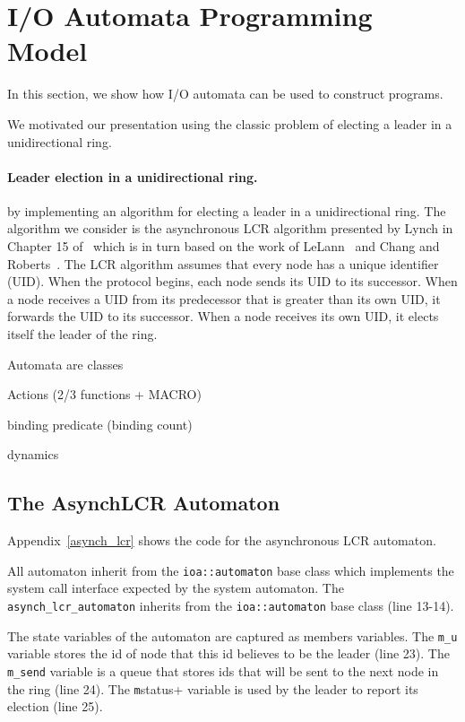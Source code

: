 \section{I/O Automata Programming Model\label{representation}}

In this section, we show how I/O automata can be used to construct programs.




We motivated our presentation using the classic problem of electing a leader in a unidirectional ring.

\paragraph{Leader election in a unidirectional ring.}

 by implementing an algorithm for electing a leader in a unidirectional ring.
The algorithm we consider is the asynchronous LCR algorithm presented by Lynch in Chapter 15 of~\cite{lynch1996distributed} which is in turn based on the work of LeLann~\cite{le1977distributed} and Chang and Roberts~\cite{chang1979improved}.
The LCR algorithm assumes that every node has a unique identifier (UID).
When the protocol begins, each node sends its UID to its successor.
When a node receives a UID from its predecessor that is greater than its own UID, it forwards the UID to its successor.
When a node receives its own UID, it elects itself the leader of the ring.


Automata are classes

Actions (2/3 functions + MACRO)

binding predicate (binding count)

dynamics


\subsection{The AsynchLCR Automaton}

Appendix~\ref{asynch_lcr} shows the code for the asynchronous LCR automaton.

All automaton inherit from the \verb+ioa::automaton+ base class which implements the system call interface expected by the system automaton.
The \verb+asynch_lcr_automaton+ inherits from the \verb+ioa::automaton+ base class (line 13-14).

The state variables of the automaton are captured as members variables.
The \verb+m_u+ variable stores the id of node that this id believes to be the leader (line 23).
The \verb+m_send+ variable is a queue that stores ids that will be sent to the next node in the ring (line 24).
The \verb+m+status+ variable is used by the leader to report its election (line 25).

